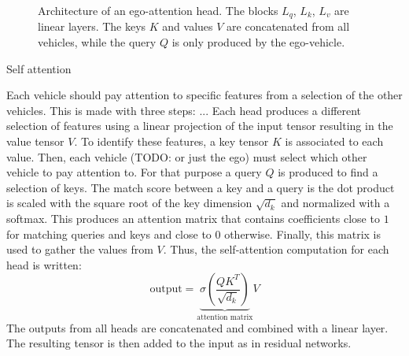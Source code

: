 \documentclass{article}
\begin{document}
\begin{figure}[ht]
	\caption{Architecture of an ego-attention head.
		The blocks $L_{q}$, $L_{k}$, $L_{v}$ are linear layers. The keys $K$ and values $V$ are concatenated from all vehicles, while the query $Q$ is only produced by the ego-vehicle.}
	\label{fig:ego-attention}
\end{figure}





Self attention

Each vehicle should pay attention to specific features from a selection of the other vehicles.
This is made with three steps: ...
Each head produces a different selection of features using a linear projection of
the input tensor resulting in the value tensor $V$.
To identify these features, a key tensor $K$ is associated to each value.
Then, each vehicle (TODO: or just the ego) must select which other vehicle to pay attention to.
For that purpose a query $Q$ is produced to find a selection of keys.
The match score between a key and a query is the dot product is scaled with the square root of the key
dimension $\sqrt{d_k}$ and normalized with a softmax.
This produces an attention matrix that contains coefficients close to $1$ for matching queries and keys
and close to $0$ otherwise.
Finally, this matrix is used to gather the values from $V$.
Thus, the self-attention computation for each head is written:
\begin{equation}
\text{output}=\underbrace{\sigma\left(\frac{QK^T}{\sqrt{d_k}}\right)}_{\text{attention matrix}}V
\label{eq_selfattention}
\end{equation}
The outputs from all heads are concatenated and combined with a linear layer.
The resulting tensor is then added to the input as in residual networks.
\end{document}
